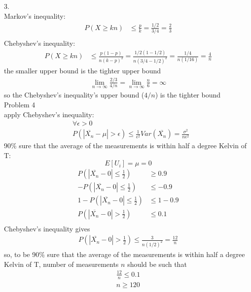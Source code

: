 \documentclass[12pt,border=4pt,multi]{article} %
\begin{document}
\\
\\
\\
\\
3.\\
Markov's inequality:
\begin{align*}
P(X \geq kn) &\leq \frac{p}{k} = \frac{1 / 2}{3 / 4} = \frac{2}{3}\\
\end{align*}
Chebyshev's inequality: 
\begin{align*}
P(X \geq kn) &\leq \frac{p(1 - p)}{n(k - p)^2} = \frac{1 /2 (1 - 1 / 2)}{n(3 / 4 - 1 / 2)^2} = \frac{1 / 4}{n(1 / 16)} = \frac{4}{n}
\end{align*}
the smaller upper bound is the tighter upper bound
\begin{align*}
\lim_{n \rightarrow \infty} \frac{2 / 3}{4 / n} = \lim_{n \rightarrow \infty} \frac{n}{6} = \infty
\end{align*}
so the Chebyshev's inequality's upper bound ($4 / n$) is the tighter bound\\
\newpage
\noindent
Problem 4\\
apply Chebyshev's inequality:
\begin{align*}
&\forall \epsilon > 0\\
&P(|\overline{X_n} - \mu| > \epsilon) \leq \frac{1}{\epsilon^2} Var(\overline{X_n}) = \frac{\sigma^2}{n\epsilon^2}
\end{align*}
90\% sure that the average of the measurements is within half a degree Kelvin of T:
\[E[U_i] = \mu = 0\]
\begin{align*}
P\left(|\overline{X_n} - 0| \leq \frac{1}{2}\right) &\geq 0.9\\
- P\left(|\overline{X_n} - 0| \leq \frac{1}{2}\right) &\leq - 0.9\\
1 - P\left(|\overline{X_n} - 0| \leq \frac{1}{2}\right) &\leq 1 - 0.9\\
P\left(|\overline{X_n} - 0| > \frac{1}{2}\right) &\leq 0.1\\
\end{align*}
Chebyshev's inequality gives
\begin{align*}
P\left(|\overline{X_n} - 0| > \frac{1}{2}\right) \leq \frac{3}{n(1 / 2)^2} = \frac{12}{n}
\end{align*}
so, to be 90\% sure that the average of the measurements is within half a degree Kelvin of T, number of measurements $n$ should be such that
\begin{align*}
\frac{12}{n} \leq 0.1\\
\boxed{n \geq 120}\\
\end{align*}
\end{document}
